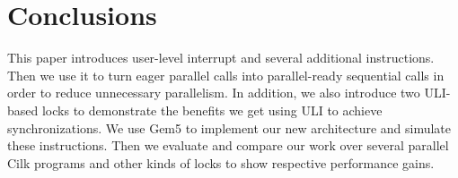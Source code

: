 \section{Conclusions}
This paper introduces user-level interrupt and several additional instructions. Then we use it to turn eager parallel calls into parallel-ready sequential calls in order to reduce unnecessary parallelism. In addition, we also introduce two ULI-based locks to demonstrate the benefits we get using ULI to achieve synchronizations. We use Gem5 to implement our new architecture and simulate these instructions. Then we evaluate and compare our work over several parallel Cilk programs and other kinds of locks to show respective performance gains.
